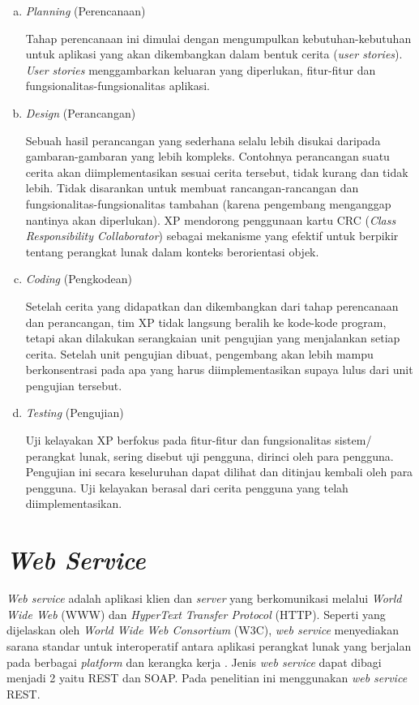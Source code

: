 \begin{enumerate}[a.]
	\item \textit{Planning} (Perencanaan)
	
	Tahap perencanaan ini dimulai dengan mengumpulkan kebutuhan-kebutuhan untuk aplikasi yang akan dikembangkan dalam bentuk cerita (\textit{user stories}). \textit{User stories} menggambarkan keluaran yang diperlukan, fitur-fitur dan fungsionalitas-fungsionalitas aplikasi.
	
	\item \textit{Design} (Perancangan)
	
	Sebuah hasil perancangan yang sederhana selalu lebih disukai daripada gambaran-gambaran yang lebih kompleks. Contohnya perancangan suatu cerita akan diimplementasikan sesuai cerita tersebut, tidak kurang dan tidak lebih. Tidak disarankan untuk membuat rancangan-rancangan dan fungsionalitas-fungsionalitas tambahan (karena pengembang menganggap nantinya akan diperlukan). XP mendorong penggunaan kartu CRC (\textit{Class Responsibility Collaborator}) sebagai mekanisme yang efektif untuk berpikir tentang perangkat lunak dalam konteks berorientasi objek.
	
	\item \textit{Coding} (Pengkodean)
	
	Setelah cerita yang didapatkan dan dikembangkan dari tahap perencanaan dan perancangan, tim XP tidak langsung beralih ke kode-kode program, tetapi akan dilakukan serangkaian unit pengujian yang menjalankan setiap cerita. Setelah unit pengujian dibuat, pengembang akan lebih mampu berkonsentrasi pada apa yang harus diimplementasikan supaya lulus dari unit pengujian tersebut.
	
	\item \textit{Testing} (Pengujian)
	
	Uji kelayakan XP berfokus pada fitur-fitur dan fungsionalitas sistem/ perangkat lunak, sering disebut uji pengguna, dirinci oleh para pengguna. Pengujian ini secara keseluruhan dapat dilihat dan ditinjau kembali oleh para pengguna. Uji kelayakan berasal dari cerita pengguna yang telah diimplementasikan.
\end{enumerate}

\section{\textit{Web Service}}
\textit{Web service} adalah aplikasi klien dan \textit{server} yang berkomunikasi melalui \textit{World Wide Web} (WWW) dan \textit{HyperText Transfer Protocol} (HTTP). Seperti yang dijelaskan oleh \textit{World Wide Web Consortium} (W3C), \textit{web service} menyediakan sarana standar untuk interoperatif antara aplikasi perangkat lunak yang berjalan pada berbagai \textit{platform} dan kerangka kerja \citep{oracle2018}. Jenis \textit{web service} dapat dibagi menjadi 2 yaitu REST dan SOAP. Pada penelitian ini menggunakan \textit{web service} REST.

